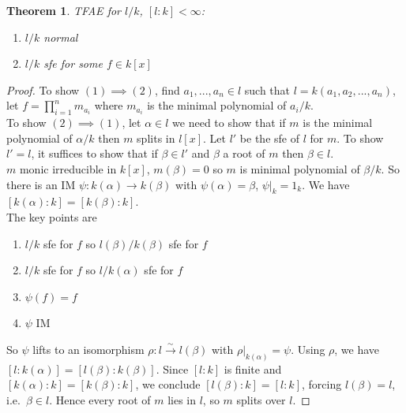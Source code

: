 \documentclass[a4paper,12pt]{article}
\newtheorem{thm}{Theorem}[section]
\begin{document}
\begin{thm}
    TFAE for $l/k$, $[l:k]<\infty$:
    \begin{enumerate}
        \item $l/k$ normal
        \item $l/k$ sfe for some $f\in k[x]$
    \end{enumerate}
\end{thm}
\begin{proof}
    To show $(1)\implies (2)$, find $a_1,...,a_n\in l$ such that $l=k(a_1,a_2,...,a_n)$, let $f=\prod_{i=1}^n m_{a_i}$ where $m_{a_i}$ is the minimal polynomial of $a_i/k$. \\
    To show $(2)\implies (1)$, let $\alpha\in l$ we need to show that if $m$ is the minimal polynomial of $\alpha/k$ then $m$ splits in $l[x]$. Let $l'$ be the sfe of $l$ for $m$. To show $l'=l$, it suffices to show that if $\beta\in l'$ and $\beta$ a root of $m$ then $\beta\in l$.\\
    $m$ monic irreducible in $k[x]$, $m(\beta)=0$ so $m$ is minimal polynomial of $\beta/k$. So there is an IM $\psi:k(\alpha)\to k(\beta)$ with $\psi(\alpha)=\beta$, $\psi|_k=1_k$. We have $[k(\alpha):k]=[k(\beta):k]$. \\
    The key points are 
    \begin{enumerate}
        \item $l/k$ sfe for $f$ so $l(\beta)/k(\beta)$ sfe for $f$
        \item $l/k$ sfe for $f$ so $l/k(\alpha)$ sfe for $f$
        \item $\psi(f)=f$
        \item $\psi$ IM 
    \end{enumerate}
    So $\psi$ lifts to an isomorphism $\rho:l\xrightarrow{\sim} l(\beta)$ with $\rho|_{k(\alpha)}=\psi$. Using $\rho$, we have $[l:k(\alpha)]=[l(\beta):k(\beta)]$. Since $[l:k]$ is finite and $[k(\alpha):k]=[k(\beta):k]$, we conclude $[l(\beta):k]=[l:k]$, forcing $l(\beta)=l$, i.e.\ $\beta\in l$. Hence every root of $m$ lies in $l$, so $m$ splits over $l$.
\end{proof}
\newpage
\end{document}
